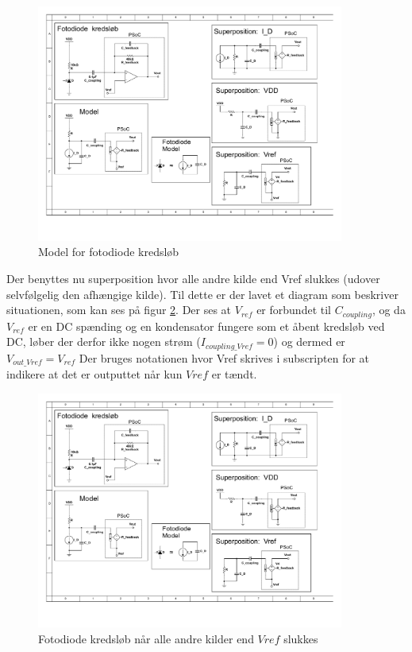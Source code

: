 \documentclass[HardwareDesign/HardwareDesign_main.tex]{subfiles}
\begin{document}
\begin{figure}[H]
    \centering
    \includegraphics[width=0.9\textwidth,trim={0.6in 2.4in 7in 3.5in},clip, page=1]{HardwareDesign/CupSensor/graphics/Superposition.pdf}
    \caption{Model for fotodiode kredsløb}
    \label{fig:photodiodeCircuitModel}
\end{figure}

Der benyttes nu superposition hvor alle andre kilde end Vref slukkes (udover selvfølgelig den afhængige kilde). Til dette er der lavet et diagram som beskriver situationen, som kan ses på figur \ref{fig:photodiodeSPVref}. Der ses at $V_{ref}$ er forbundet til $C_{coupling}$, og da $V_{ref}$ er en DC spænding og en kondensator fungere som et åbent kredsløb ved DC, løber der derfor ikke nogen strøm ($I_{coupling\_Vref}=0$) og dermed er $V_{out\_Vref}=V_{ref}$ Der bruges notationen hvor Vref skrives i subscripten for at indikere at det er outputtet når kun $Vref$ er tændt.

\begin{figure}[H]
    \centering
    \includegraphics[width=0.9\textwidth,trim={6.3in 1.3in 1in 5in},clip, page=1]{HardwareDesign/CupSensor/graphics/Superposition.pdf}
    \caption{Fotodiode kredsløb når alle andre kilder end $Vref$ slukkes}
    \label{fig:photodiodeSPVref}
\end{figure}
\end{document}
